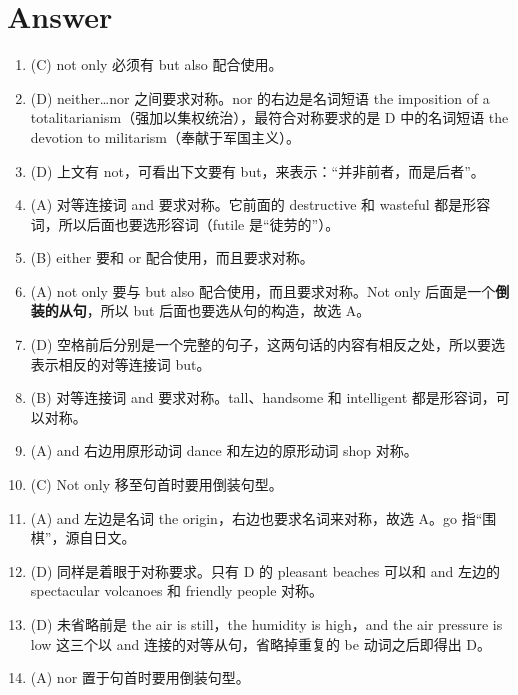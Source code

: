 \section{Answer}
\begin{enumerate}
\item (C) not only 必须有 but also 配合使用。

\item (D) neither…nor 之间要求对称。nor 的右边是名词短语 the imposition of a totalitarianism（强加以集权统治），最符合对称要求的是 D 中的名词短语 the devotion to militarism（奉献于军国主义）。

\item (D) 上文有 not，可看出下文要有 but，来表示：“并非前者，而是后者”。

\item (A) 对等连接词 and 要求对称。它前面的 destructive 和 wasteful 都是形容词，所以后面也要选形容词（futile 是“徒劳的”）。

\item  (B) either 要和 or 配合使用，而且要求对称。

\item (A) not only 要与 but also 配合使用，而且要求对称。Not only 后面是一个\textbf{倒装的从句}，所以 but 后面也要选从句的构造，故选 A。
\item  (D) 空格前后分别是一个完整的句子，这两句话的内容有相反之处，所以要选表示相反的对等连接词 but。

\item (B) 对等连接词 and 要求对称。tall、handsome 和 intelligent 都是形容词，可以对称。


\item (A) and 右边用原形动词 dance 和左边的原形动词 shop 对称。

\item (C) Not only 移至句首时要用倒装句型。
\item  (A) and 左边是名词 the origin，右边也要求名词来对称，故选 A。go 指“围棋”，源自日文。

\item (D) 同样是着眼于对称要求。只有 D 的 pleasant beaches 可以和 and 左边的 spectacular volcanoes 和 friendly people 对称。

\item (D) 未省略前是 the air is still，the humidity is high，and the air pressure is low 这三个以 and 连接的对等从句，省略掉重复的 be 动词之后即得出 D。

\item(A) nor 置于句首时要用倒装句型。


\end{enumerate}
